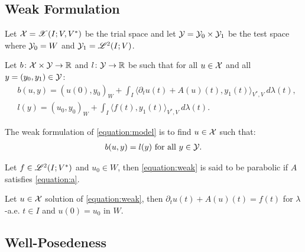 \newpage
\subsection{Weak Formulation}

\begin{definition}
    Let $\mathcal{X} = \mathscr{X}(I; V, V^*)$ be the trial space and let $\mathcal{Y} = \mathcal{Y}_0 \times \mathcal{Y}_1$ be the test space where $\mathcal{Y}_0 = W$ and $\mathcal{Y}_1 = \mathscr{L}^{2}(I; V)$.
\end{definition}

\begin{definition}[$b$ and $l$]
    Let $b \colon \mathcal{X} \times \mathcal{Y} \rightarrow \mathbb{R}$ and $l \colon \mathcal{Y} \rightarrow \mathbb{R}$ be such that for all $u \in \mathcal{X}$ and all $y = (y_0, y_1) \in \mathcal{Y}$:
    \begin{align}
        & b(u, y) = \left( u(0), y_0 \right)_W + \int_I \langle \partial_t u(t) + A(u)(t), y_1(t) \rangle_{V^*, V} ~ d \lambda(t), \\
        & l(y) = \left( u_0, y_0 \right)_W + \int_I \langle f(t), y_1(t) \rangle_{V^*, V} ~ d \lambda(t).
    \end{align}
\end{definition}

\begin{definition}
    The weak formulation of \cref{equation:model} is to find $u \in \mathcal{X}$ such that:
    \begin{align}
        b(u, y) = l(y) \text{ for all } y \in \mathcal{Y}. \label{equation:weak}
    \end{align}
\end{definition}

\begin{definition}
    Let $f \in \mathscr{L}^{2}(I; V^*)$ and $u_0 \in W$, then \cref{equation:weak} is said to be parabolic if $A$ satisfies \cref{equation:a}.
\end{definition}

\begin{lemma}
    Let $u \in \mathcal{X}$ solution of \cref{equation:weak}, then $\partial_t u(t) + A(u)(t) = f(t)$ for $\lambda$-a.e. $t \in I$ and $u(0) = u_0$ in $W$.
\end{lemma}

\newpage
\subsection{Well-Posedeness}

